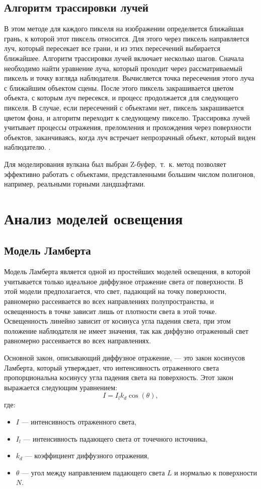 \subsection{Алгоритм трассировки лучей}
В этом методе для каждого пикселя на изображении определяется ближайшая грань, к которой этот пиксель относится. Для этого через пиксель направляется луч, который пересекает все грани, и из этих пересечений выбирается ближайшее. Алгоритм трассировки лучей включает несколько шагов. Сначала необходимо найти уравнение луча, который проходит через рассматриваемый пиксель и точку взгляда наблюдателя. Вычисляется точка пересечения этого луча с ближайшим объектом сцены. После этого пиксель закрашивается цветом объекта, с которым луч пересекся, и процесс продолжается для следующего пикселя. В случае, если пересечений с объектами нет, пиксель закрашивается цветом фона, и алгоритм переходит к следующему пикселю. Трассировка лучей учитывает процессы отражения, преломления и прохождения через поверхности объектов, заканчиваясь, когда луч встречает непрозрачный объект, который виден наблюдателю. 
\cite{lit2}.

Для моделирования вулкана был выбран Z-буфер,~т.~к. метод позволяет эффективно работать с объектами, представленными большим числом полигонов, например, реальными горными ландшафтами.

\section{Анализ моделей освещения}
\subsection{Модель Ламберта}
Модель Ламберта является одной из простейших моделей освещения, в которой учитывается только идеальное диффузное отражение света от поверхности. В этой модели предполагается, что свет, падающий на точку поверхности, равномерно рассеивается во всех направлениях полупространства, и освещенность в точке зависит лишь от плотности света в этой точке. Освещенность линейно зависит от косинуса угла падения света, при этом положение наблюдателя не имеет значения, так как диффузно отраженный свет равномерно рассеивается во всех направлениях.

Основной закон, описывающий диффузное отражение, — это закон косинусов Ламберта, который утверждает, что интенсивность отраженного света пропорциональна косинусу угла падения света на поверхность. Этот закон выражается следующим уравнением:
\begin{equation}
	I = I_l k_d \cos(\theta),
\end{equation}
где:  
\begin{itemize}
	\item $I$ — интенсивность отраженного света,  
	\item $I_l$ — интенсивность падающего света от точечного источника,  
	\item $k_d$ — коэффициент диффузного отражения,  
	\item $\theta$ — угол между направлением падающего света $L$ и нормалью к поверхности $N$.  
\end{itemize}

